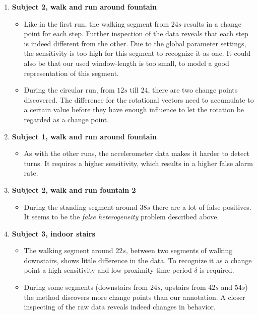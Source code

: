 \begin{enumerate}
  \item \textbf{Subject 2, walk and run around fountain} 
    \begin{itemize}
      \item Like in the first run, the walking segment from $24s$ results in a change point for each step.
      Further inspection of the data reveals that each step is indeed different from the other.
      Due to the global parameter settings, the sensitivity is too high for this segment to recognize it as one.
      It could also be that our used window-length is too small, to model a good representation of this segment.
      \item During the circular run, from $12s$ till $24$, there are two change points discovered.
      The difference for the rotational vectors need to accumulate to a certain value before they have enough influence to let the rotation be regarded as a change point.
    \end{itemize}
  \item \textbf{Subject 1, walk and run around fountain} 
    \begin{itemize}
      \item As with the other runs, the accelerometer data makes it harder to detect turns.
      It requires a higher sensitivity, which results in a higher false alarm rate.
    \end{itemize}
  \item \textbf{Subject 2, walk and run fountain 2} 
    \begin{itemize}
      \item During the standing segment around $38s$ there are a lot of false positives.
      It seems to be the \emph{false heterogeneity} problem described above.
    \end{itemize}
  \item \textbf{Subject 3, indoor stairs} 
    \begin{itemize}
      \item The walking segment around $22s$, between two segments of walking downstairs, shows little difference in the data.
      To recognize it as a change point a high sensitivity and low proximity time period $\delta$ is required.
      \item During some segments (downstairs from $24s$, upstairs from $42s$ and $54s$) the method discovers more change points than our annotation.
      A closer inspecting of the raw data reveals indeed changes in behavior.

\end{itemize}
\end{enumerate}
